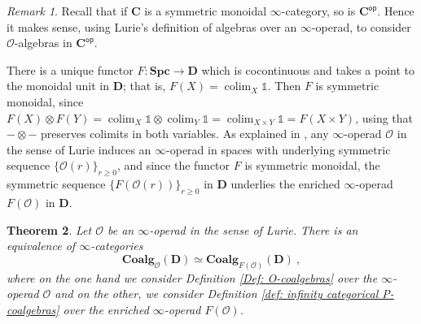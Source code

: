 \documentclass[a4paper,12pt]{amsart}
\DeclareMathOperator*{\colim}{colim}
\theoremstyle{plain}
\newtheorem{theorem}{Theorem}[section]
\theoremstyle{definition}
\theoremstyle{remark}
\newtheorem{remark}[theorem]{\sc Remark}%
\begin{document}
\begin{remark}
Recall that if $\mathbf{C}$ is a symmetric monoidal $\infty$-category, so is $\mathbf{C}^{\mathsf{op}}$. Hence it makes sense, using Lurie's definition of algebras over an $\infty$-operad, to consider $\mathscr{O}$-algebras in $\mathbf{C}^{\mathsf{op}}$.
\end{remark}

There is a unique functor $F : \mathbf{Spc}\longrightarrow \mathbf D$ which is cocontinuous and takes a point to the monoidal unit in $\mathbf D$; that is, $F(X)=\colim_X \mathbb 1$. Then $F$ is symmetric monoidal, since $F(X) \otimes F(Y) = \colim_X \mathbb 1 \otimes \colim_Y \mathbb 1 = \colim_{X \times Y} \mathbb 1 = F(X\times Y)$, using that $-\otimes-$ preserves colimits in both variables.
As explained in \cite[Appendix A.2]{ShiPhD}, any $\infty$-operad $\mathscr{O}$ in the sense of Lurie induces an $\infty$-operad  in spaces with underlying symmetric sequence $\{\mathscr{O}(r)\}_{r \geq 0}$, and since the functor $F$ is symmetric monoidal, the symmetric sequence $\{F(\mathscr{O}(r))\}_{r \geq 0}$ in $\mathbf{D}$ underlies the enriched $\infty$-operad $F(\mathscr{O})$ in $\mathbf{D}$.

\begin{theorem}\label{thm: comparison with coalgebras in the sense of Lurie}
Let $\mathscr{O}$ be an $\infty$-operad in the sense of Lurie. There is an equivalence of $\infty$-categories
\[
\mathbf{Coalg}_{\mathscr{O}}(\mathbf{D}) \simeq \mathbf{Coalg}_{F(\mathscr{O})}(\mathbf{D})~,
\]where on the one hand we consider Definition \ref{Def: O-coalgebras} over the $\infty$-operad $\mathscr{O}$ and on the other, we consider Definition \ref{def: infinity categorical P-coalgebras} over the enriched $\infty$-operad $F(\mathscr{O})$. 
\end{theorem}
\end{document}

